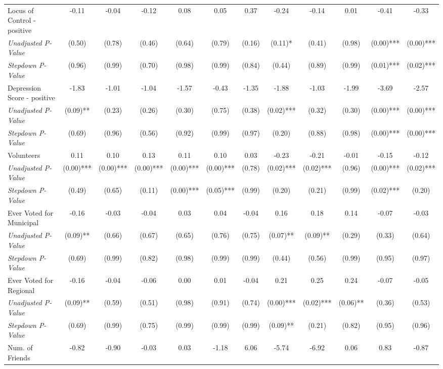 \begin{tabular}{l c c c c c c c c c c c}
Locus of Control - positive & -0.11 & -0.04 & -0.12 & 0.08 & 0.05 & 0.37 & -0.24 & -0.14 & 0.01 & -0.41 & -0.33 \\
\quad \textit{Unadjusted P-Value} & (0.50) & (0.78) & (0.46) & (0.64) & (0.79) & (0.16) & (0.11)* & (0.41) & (0.98) & (0.00)*** & (0.00)*** \\
\quad \textit{Stepdown P-Value} & (0.96) & (0.99) & (0.70) & (0.98) & (0.99) & (0.84) & (0.44) & (0.89) & (0.99) & (0.01)*** & (0.02)*** \\
Depression Score - positive & -1.83 & -1.01 & -1.04 & -1.57 & -0.43 & -1.35 & -1.88 & -1.03 & -1.99 & -3.69 & -2.57 \\
\quad \textit{Unadjusted P-Value} & (0.09)** & (0.23) & (0.26) & (0.30) & (0.75) & (0.38) & (0.02)*** & (0.32) & (0.30) & (0.00)*** & (0.00)*** \\
\quad \textit{Stepdown P-Value} & (0.69) & (0.96) & (0.56) & (0.92) & (0.99) & (0.97) & (0.20) & (0.88) & (0.98) & (0.00)*** & (0.00)*** \\
Volunteers & 0.11 & 0.10 & 0.13 & 0.11 & 0.10 & 0.03 & -0.23 & -0.21 & -0.01 & -0.15 & -0.12 \\
\quad \textit{Unadjusted P-Value} & (0.00)*** & (0.00)*** & (0.00)*** & (0.00)*** & (0.00)*** & (0.78) & (0.02)*** & (0.02)*** & (0.96) & (0.00)*** & (0.02)*** \\
\quad \textit{Stepdown P-Value} & (0.49) & (0.65) & (0.11) & (0.00)*** & (0.05)*** & (0.99) & (0.20) & (0.21) & (0.99) & (0.02)*** & (0.20) \\
Ever Voted for Municipal & -0.16 & -0.03 & -0.04 & 0.03 & 0.04 & -0.04 & 0.16 & 0.18 & 0.14 & -0.07 & -0.03 \\
\quad \textit{Unadjusted P-Value} & (0.09)** & (0.66) & (0.67) & (0.65) & (0.76) & (0.75) & (0.07)** & (0.09)** & (0.29) & (0.33) & (0.64) \\
\quad \textit{Stepdown P-Value} & (0.69) & (0.99) & (0.82) & (0.98) & (0.99) & (0.99) & (0.44) & (0.56) & (0.99) & (0.95) & (0.97) \\
Ever Voted for Regional & -0.16 & -0.04 & -0.06 & 0.00 & 0.01 & -0.04 & 0.21 & 0.25 & 0.24 & -0.07 & -0.05 \\
\quad \textit{Unadjusted P-Value} & (0.09)** & (0.59) & (0.51) & (0.98) & (0.91) & (0.74) & (0.00)*** & (0.02)*** & (0.06)** & (0.36) & (0.53) \\
\quad \textit{Stepdown P-Value} & (0.69) & (0.99) & (0.75) & (0.99) & (0.99) & (0.99) & (0.09)** & (0.21) & (0.82) & (0.95) & (0.96) \\
Num. of Friends & -0.82 & -0.90 & -0.03 & 0.03 & -1.18 & 6.06 & -5.74 & -6.92 & 0.06 & 0.83 & -0.87 \\

\end{tabular}
